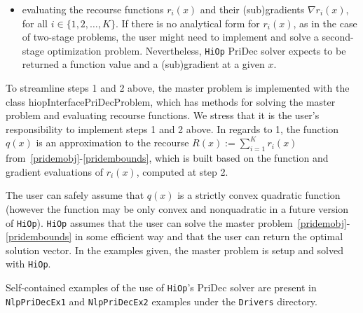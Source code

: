 \documentclass[11pt]{article}
\newcounter{line}
\newcommand{\Hi}{\texttt{HiOp}\xspace}
\begin{document}
\begin{itemize}
\begin{align}
  \end{align}
		where no recourse functions exist. To determine whether $q(x)$ is included in the objective, a boolean variable is used. The basecase problem class also contains a hiopInterfacePriDecProblem::RecourseApproxEvaluator object, that stores and updates the function $q(x)$. The PriDec solver constructs $q(x)$ at each iteration and then passes it on to the basecase problem so that the full problem~\eqref{pridemobj}-\eqref{pridembounds} can be solved. In other words, the user does not need to provide $q(x)$ in their objective, but needs to write the basecase problem~\eqref{pridembaseobj}-\eqref{pridembasebounds} such that its objective (or potentially constraint in the future) can be extended. 
	\item[2.] evaluating the recourse functions $r_i(x)$ and their (sub)gradients $\nabla r_i(x)$, for all $i\in\{1,2,\ldots, K\}$. If there is no analytical form for $r_i(x)$, as in the case of two-stage problems, the user might need to implement and solve a second-stage optimization problem. Nevertheless, \Hi PriDec solver expects to be returned a function value and a (sub)gradient at a given $x$.
\end{itemize}
To streamline steps 1 and 2 above, the master problem is implemented with the class hiopInterfacePriDecProblem, which has methods for solving the master problem and evaluating recourse functions. We stress that it is the user's responsibility to implement steps 1 and 2 above. In regards to 1, the function  $q(x)$ is an approximation to the recourse $R(x):=\sum_{i=1}^K r_i(x)$ from~\eqref{pridemobj}-\eqref{pridembounds}, which is built based on the function and gradient evaluations of $r_i(x)$, computed at step 2.  

The user can safely assume that $q(x)$ is a strictly  convex quadratic function (however the function may be only convex and nonquadratic in a future version of \Hi). \Hi assumes that the user can solve the master problem~\eqref{pridemobj}-\eqref{pridembounds} in some efficient way and that the user can return the optimal solution vector. In the examples given, the master problem is setup and solved with \Hi.

\medskip

Self-contained examples of the use of \Hi's PriDec solver are present in  \texttt{NlpPriDecEx1} and \texttt{NlpPriDecEx2} examples under the \texttt{Drivers} directory. 

%
%
\end{document}
